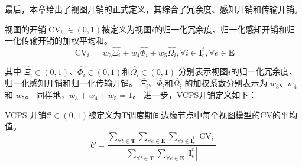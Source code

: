 最后，本章给出了视图开销的正式定义，其综合了冗余度、感知开销和传输开销。
\begin{definition}
视图的开销$\operatorname{CV}_{i} \in (0, 1)$被定义为视图$i$的归一化冗余度、归一化感知开销和归一化传输开销的加权平均和。
	\begin{equation}
	    \operatorname{CV}_{i} = w_3  \hat{\Xi_{i}} +  w_4 \hat{\Phi_{i}} + w_5 \hat{\Omega_{i}}, \forall i \in \mathbf{I}_{e}^t, \forall e \in \mathbf{E}
	\end{equation}
\end{definition}
\noindent 其中 $\hat{\Xi_{i}}\in (0, 1)$、$\hat{\Phi_{i}} \in (0, 1)$和$\hat{\Omega_{i}} \in (0, 1)$ 分别表示视图$i$的归一化冗余度、归一化感知开销和归一化传输开销。
$\hat{\Xi_{i}}$、$\hat{\Phi_{i}}$和$\hat{\Omega_{i}}$ 的加权系数分别表示为 $w_3$、$w_4$和 $w_5$。
同样地，$w_3+w_4+w_5=1$。
进一步，VCPS开销定义如下：
\begin{definition}
VCPS 开销$\mathscr{C} \in (0, 1)$被定义为$\mathbf{T}$调度期间边缘节点中每个视图模型的CV的平均值。
	\begin{equation}
		\mathscr{C}=\frac{\sum_{\forall t \in \mathbf{T}} \sum_{\forall e \in \mathbf{E}} \sum_{\forall i \in \mathbf{I}_e^t}  \operatorname{CV}_{i}}{\sum_{\forall t \in \mathbf{T}} \sum_{\forall e \in \mathbf{E}} |\mathbf{I}_e^t| }
	\end{equation}
\end{definition}

